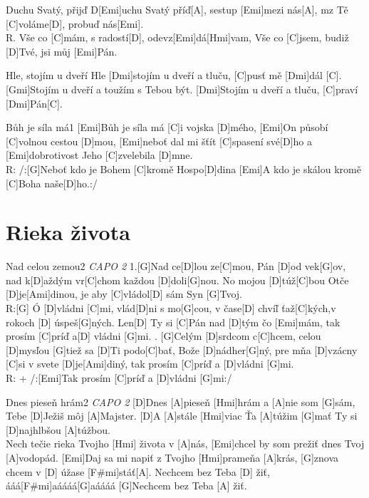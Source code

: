 \documentclass[12pt]{article}
\begin{document}
\begin{songgroup}{2}
\begin{groupitem}{Duchu Svatý, přijď}
	D[Emi]uchu Svatý příď[A], sestup [Emi]mezi nás[A],
	mz Tě [C]voláme[D], probuď nás[Emi].
	\\
	R. Vše co [C]mám, s radostí[D], odevz[Emi]dá[Hmi]vam,
	Vše co [C]jsem, budiž [D]Tvé, jsi můj [Emi]Pán.	
\end{groupitem}
\columnbreak
	
\begin{groupitem}{Hle, stojím u dveří}
	Hle [Dmi]stojím u dveří a tluču, [C]pusť mě [Dmi]dál [C].
	[Gmi]Stojím u dveří a toužím s Tebou být.
	[Dmi]Stojím u dveří a tluču, [C]praví [Dmi]Pán[C].
\end{groupitem}

\end{songgroup}
	
\begin{song}{Bůh je síla má}{1}
	[Emi]Bůh je síla má [C]i vojska [D]mého,
	[Emi]On působí [C]volnou cestou [D]mou,
	[Emi]neboť dal mi šťít [C]spasení své[D]ho
	a [Emi]dobrotivost Jeho [C]zvelebila [D]mne.
	\\
	R: /:[G]Neboť kdo je Bohem [C]kromě Hospo[D]dina
	[Emi]A kdo je skálou kromě [C]Boha naše[D]ho.:/
\end{song}

\newpage
	
\section{Rieka života}
\begin{song}{Nad celou zemou}{2}
	\textit{CAPO 2}
	1.[G]Nad ce[D]lou ze[C]mou, Pán [D]od vek[G]ov,
	nad k[D]aždým vr[C]chom každou [D]doli[G]nou.
	No mojou [D]túž[C]bou Otče [D]je[Ami]dinou,
	je aby [C]vládol[D] sám Syn [G]Tvoj.
	\\
	R:[G] Ó [D]vládni [C]mi, vlád[D]ni s mo[G]cou,
	v čase[D] chvíľ ťaž[C]kých,v rokoch [D] úspeš[G]ných.
	Len[D] Ty si [C]Pán nad [D]tým čo [Emi]mám,
	tak prosím [C]príď a[D] vládni [G]mi.
	. [G]Celým [D]srdcom c[C]hcem, celou [D]mysľou [G]tiež 
	sa [D]Ti podo[C]bať, Bože [D]nádher[G]ný, 
	pre mňa [D]vzácny [C]si v svete [D]je[Ami]diný, 
	tak prosím [C]príď a [D]vládni [G]mi.
	\\
	R: + /:[Emi]Tak prosím [C]príď a [D]vládni [G]mi:/
\end{song}
	
\begin{song}{Dnes pieseň hrám}{2}
	\textit{CAPO 2}
	[D]Dnes [A]pieseň [Hmi]hrám a [A]nie som [G]sám, 
	Tebe [D]Ježiš môj [A]Majster.
	[D]A [A]stále [Hmi]viac Ťa [A]túžim [G]mať 
	Ty si [D]najhlbšou [A]túžbou.
	\\
	[Emi]Nech tečie rieka Tvojho [Hmi] života v [A]nás,
	[Emi]chcel by som prežiť dnes Tvoj [A]vodopád.
	[Emi]Daj sa mi napiť z Tvojho [Hmi]prameňa [A]krás,
	[G]znova chcem v [D] úžase [F#mi]stáť[A].
	\columnbreak
	Nechcem bez Teba [D] žiť,
	ááá[F#mi]aáááá[G]aáááá
	[G]Nechcem bez Teba [A] žiť.
\end{song}
	
\end{document}

